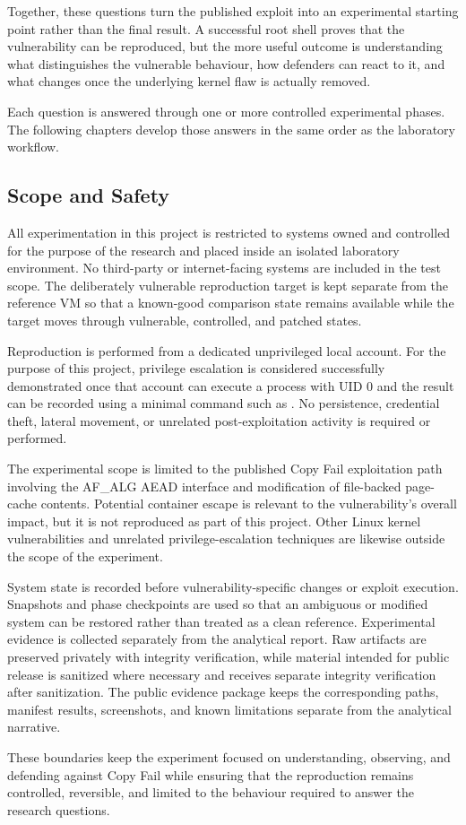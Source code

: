 Together, these questions turn the published exploit into an experimental
starting point rather than the final result. A successful root shell proves that
the vulnerability can be reproduced, but the more useful outcome is understanding
what distinguishes the vulnerable behaviour, how defenders can react to it, and
what changes once the underlying kernel flaw is actually removed.

Each question is answered through one or more controlled experimental phases.
The following chapters develop those answers in the same order as the
laboratory workflow.

\subsection{Scope and Safety}

All experimentation in this project is restricted to systems owned and
controlled for the purpose of the research and placed inside an isolated
laboratory environment. No third-party or internet-facing systems are included
in the test scope. The deliberately vulnerable reproduction target is kept
separate from the reference VM so that a known-good comparison state remains
available while the target moves through vulnerable, controlled, and patched
states.

Reproduction is performed from a dedicated unprivileged local account. For the
purpose of this project, privilege escalation is considered successfully
demonstrated once that account can execute a process with UID 0 and the result
can be recorded using a minimal command such as . No persistence,
credential theft, lateral movement, or unrelated post-exploitation activity is
required or performed.

The experimental scope is limited to the published Copy Fail exploitation path
involving the AF\_ALG AEAD interface and modification of file-backed page-cache
contents. Potential container escape is relevant to the vulnerability's overall
impact, but it is not reproduced as part of this project. Other Linux kernel
vulnerabilities and unrelated privilege-escalation techniques are likewise
outside the scope of the experiment.

System state is recorded before vulnerability-specific changes or exploit
execution. Snapshots and phase checkpoints are used so that an ambiguous or
modified system can be restored rather than treated as a clean reference.
Experimental evidence is collected separately from the analytical report. Raw
artifacts are preserved privately with integrity verification, while material
intended for public release is sanitized where necessary and receives separate
integrity verification after sanitization. The public evidence package keeps
the corresponding paths, manifest results, screenshots, and known limitations
separate from the analytical narrative.

These boundaries keep the experiment focused on understanding, observing, and
defending against Copy Fail while ensuring that the reproduction remains
controlled, reversible, and limited to the behaviour required to answer the
research questions.